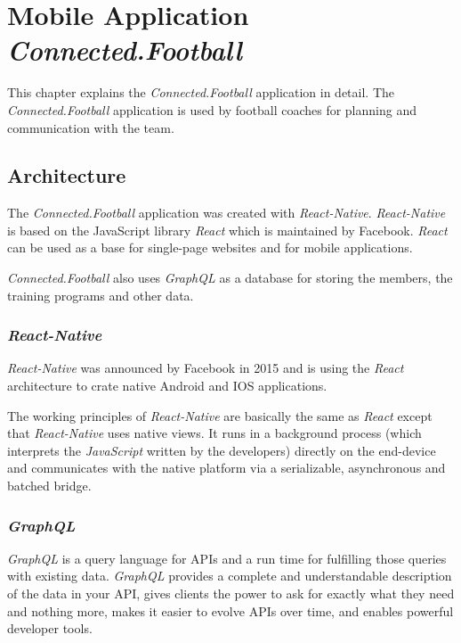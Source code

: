 \section{Mobile Application \textit{Connected.Football}}
\label{sec:Product}
This chapter explains the \textit{Connected.Football} application in detail. The \textit{Connected.Football} application is used by football coaches for planning and communication with the team. 

\subsection{Architecture}
The \textit{Connected.Football} application was created with \textit{React-Native}. \textit{React-Native} is based on the JavaScript library \textit{React} which is maintained by Facebook. \textit{React} can be used as a base for single-page websites and for mobile applications. 

\textit{Connected.Football} also uses \textit{GraphQL} as a database for storing the members, the training programs and other data. 

\subsubsection{\textit{React-Native}}
\textit{React-Native} was announced by Facebook in 2015 and is using the \textit{React} architecture to crate native Android and IOS applications. 

The working principles of \textit{React-Native} are basically the same as \textit{React} except that \textit{React-Native} uses native views. It runs in a background process (which interprets the \textit{JavaScript} written by the developers) directly on the end-device and communicates with the native platform via a serializable, asynchronous and batched bridge.

\subsubsection{\textit{GraphQL}}
\textit{GraphQL} is a query language for APIs and a run time for fulfilling those queries with existing data. \textit{GraphQL} provides a complete and understandable description of the data in your API, gives clients the power to ask for exactly what they need and nothing more, makes it easier to evolve APIs over time, and enables powerful developer tools.

